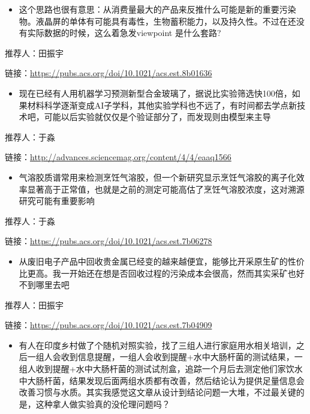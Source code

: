 \documentclass[]{book}
\providecommand{\tightlist}{%
  \setlength{\itemsep}{0pt}\setlength{\parskip}{0pt}}
\begin{document}
\begin{itemize}
\tightlist
\item
  这个思路也很有意思：从消费量最大的产品来反推什么可能是新的重要污染物。液晶屏的单体有可能具有毒性，生物蓄积能力，以及持久性。不过在还没有实际数据的时候，这么着急发viewpoint 是什么套路?
\end{itemize}

推荐人：田振宇

链接：\url{https://pubs.acs.org/doi/10.1021/acs.est.8b01636}

\begin{itemize}
\tightlist
\item
  现在已经有人用机器学习预测新型合金玻璃了，据说比实验筛选快100倍，如果材料科学逐渐变成AI子学科，其他实验学科也不远了，有时间都去学点新技术吧，可能以后实验就仅仅是个验证部分了，而发现则由模型来主导
\end{itemize}

推荐人：于淼

链接：\url{http://advances.sciencemag.org/content/4/4/eaaq1566}

\begin{itemize}
\tightlist
\item
  气溶胶质谱常用来检测烹饪气溶胶，但一个新研究显示烹饪气溶胶的离子化效率显著高于正常值，也就是之前的测定可能高估了烹饪气溶胶浓度，这对溯源研究可能有重要影响
\end{itemize}

推荐人：于淼

链接：\url{https://pubs.acs.org/doi/10.1021/acs.est.7b06278}

\begin{itemize}
\tightlist
\item
  从废旧电子产品中回收贵金属已经变的越来越便宜，能够比开采原生矿的性价比更高。我一开始还在想是否回收过程的污染成本会很高，然而其实采矿也好不到哪里去吧
\end{itemize}

推荐人：田振宇

链接：\url{https://pubs.acs.org/doi/10.1021/acs.est.7b04909}

\begin{itemize}
\tightlist
\item
  有人在印度乡村做了个随机对照实验，找了三组人进行家庭用水相关培训，之后一组人会收到信息提醒，一组人会收到提醒+水中大肠杆菌的测试结果，一组人收到提醒+水中大肠杆菌的测试试剂盒，追踪一个月后去测定他们家饮水中大肠杆菌，结果发现后面两组水质都有改善，然后结论认为提供足量信息会改善习惯与水质。其实我感觉这文章从设计到结论问题一大堆，不过最关键的是，这种拿人做实验真的没伦理问题吗？
\end{itemize}
\end{document}
